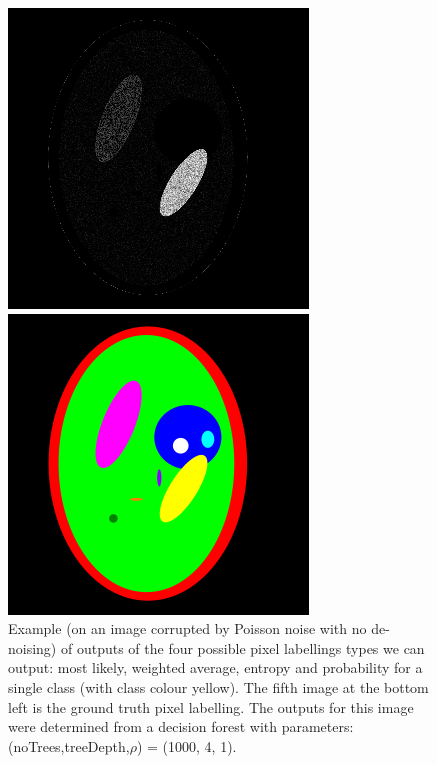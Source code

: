 \documentclass[12pt,twoside,notitlepage]{report}
\begin{document}
\begin{figure}
\begin{minipage}{0.49\textwidth}
            \end{minipage}
            \hfill
            \begin{minipage}{0.49\textwidth}
                \includegraphics[scale=0.60]{example_singleprob}
            \end{minipage}
            \centering
            \begin{minipage}{0.49\textwidth}
                \includegraphics[scale=0.72]{example_groundtruth}
            \end{minipage}
        \caption[The four possible pixel labellings types we can output.]{Example (on an image corrupted by Poisson noise with no de-noising) of outputs of the four possible pixel labellings types we can output: most likely, weighted average, entropy and probability for a single class (with class colour yellow). The fifth image at the bottom left is the ground truth pixel labelling. The outputs for this image were determined from a decision forest with parameters: (noTrees,treeDepth,$\rho$) = (1000, 4, 1).}
        \end{figure}
\end{document}
